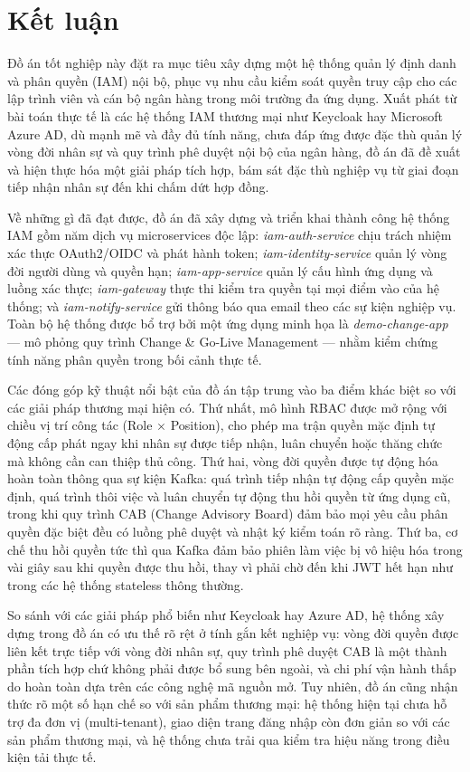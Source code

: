 \documentclass[../DoAn.tex]{subfiles}
\begin{document}
\section{Kết luận}

Đồ án tốt nghiệp này đặt ra mục tiêu xây dựng một hệ thống quản lý định danh và phân quyền (IAM) nội bộ, phục vụ nhu cầu kiểm soát quyền truy cập cho các lập trình viên và cán bộ ngân hàng trong môi trường đa ứng dụng. Xuất phát từ bài toán thực tế là các hệ thống IAM thương mại như Keycloak hay Microsoft Azure AD, dù mạnh mẽ và đầy đủ tính năng, chưa đáp ứng được đặc thù quản lý vòng đời nhân sự và quy trình phê duyệt nội bộ của ngân hàng, đồ án đã đề xuất và hiện thực hóa một giải pháp tích hợp, bám sát đặc thù nghiệp vụ từ giai đoạn tiếp nhận nhân sự đến khi chấm dứt hợp đồng.

Về những gì đã đạt được, đồ án đã xây dựng và triển khai thành công hệ thống IAM gồm năm dịch vụ microservices độc lập: \textit{iam-auth-service} chịu trách nhiệm xác thực OAuth2/OIDC và phát hành token; \textit{iam-identity-service} quản lý vòng đời người dùng và quyền hạn; \textit{iam-app-service} quản lý cấu hình ứng dụng và luồng xác thực; \textit{iam-gateway} thực thi kiểm tra quyền tại mọi điểm vào của hệ thống; và \textit{iam-notify-service} gửi thông báo qua email theo các sự kiện nghiệp vụ. Toàn bộ hệ thống được bổ trợ bởi một ứng dụng minh họa là \textit{demo-change-app} --- mô phỏng quy trình Change \& Go-Live Management --- nhằm kiểm chứng tính năng phân quyền trong bối cảnh thực tế.

Các đóng góp kỹ thuật nổi bật của đồ án tập trung vào ba điểm khác biệt so với các giải pháp thương mại hiện có. Thứ nhất, mô hình RBAC được mở rộng với chiều vị trí công tác (Role $\times$ Position), cho phép ma trận quyền mặc định tự động cấp phát ngay khi nhân sự được tiếp nhận, luân chuyển hoặc thăng chức mà không cần can thiệp thủ công. Thứ hai, vòng đời quyền được tự động hóa hoàn toàn thông qua sự kiện Kafka: quá trình tiếp nhận tự động cấp quyền mặc định, quá trình thôi việc và luân chuyển tự động thu hồi quyền từ ứng dụng cũ, trong khi quy trình CAB (Change Advisory Board) đảm bảo mọi yêu cầu phân quyền đặc biệt đều có luồng phê duyệt và nhật ký kiểm toán rõ ràng. Thứ ba, cơ chế thu hồi quyền tức thì qua Kafka đảm bảo phiên làm việc bị vô hiệu hóa trong vài giây sau khi quyền được thu hồi, thay vì phải chờ đến khi JWT hết hạn như trong các hệ thống stateless thông thường.

So sánh với các giải pháp phổ biến như Keycloak hay Azure AD, hệ thống xây dựng trong đồ án có ưu thế rõ rệt ở tính gắn kết nghiệp vụ: vòng đời quyền được liên kết trực tiếp với vòng đời nhân sự, quy trình phê duyệt CAB là một thành phần tích hợp chứ không phải được bổ sung bên ngoài, và chi phí vận hành thấp do hoàn toàn dựa trên các công nghệ mã nguồn mở. Tuy nhiên, đồ án cũng nhận thức rõ một số hạn chế so với sản phẩm thương mại: hệ thống hiện tại chưa hỗ trợ đa đơn vị (multi-tenant), giao diện trang đăng nhập còn đơn giản so với các sản phẩm thương mại, và hệ thống chưa trải qua kiểm tra hiệu năng trong điều kiện tải thực tế.
\end{document}
